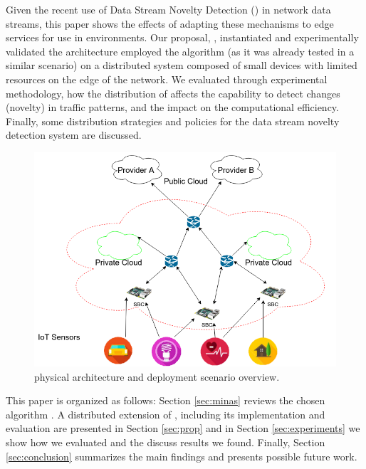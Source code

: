 Given the recent use of Data Stream Novelty Detection (\nd) in network data
streams, this paper shows the effects of adapting these mechanisms to edge
services for use in \iot environments.
Our proposal, \mfog, instantiated and experimentally validated the \arch
architecture \cite{Cassales2019a} employed the \nd algorithm \minas
\cite{Faria2013Minas,Faria2015minas} (as it was already tested in a similar \iot
scenario) on a distributed system composed of small devices with limited
resources on the edge of the network.
We evaluated through experimental methodology, how the distribution of
\minas
affects the capability to detect changes (novelty) in
traffic patterns, and the impact on the computational efficiency.
Finally, some distribution strategies and policies for the data stream
novelty detection system are discussed.

\begin{figure}
    \centering
    \includegraphics[width=0.5\linewidth]{figures/cassalesimgs-000.png}
    \caption{\arch \cite{Cassales2019a} physical architecture and deployment scenario overview.}
    \label{fig:mfog-phy-arch-cloud}
\end{figure}

This paper is organized as follows:
Section \ref{sec:minas} reviews the chosen \nd algorithm \minas.
A distributed extension of \minas, including its
implementation and evaluation are presented in Section \ref{sec:prop}
and in Section \ref{sec:experiments} we show how we evaluated \mfog and
the discuss results we found.
Finally, Section \ref{sec:conclusion} summarizes the main findings and presents
possible future work.


